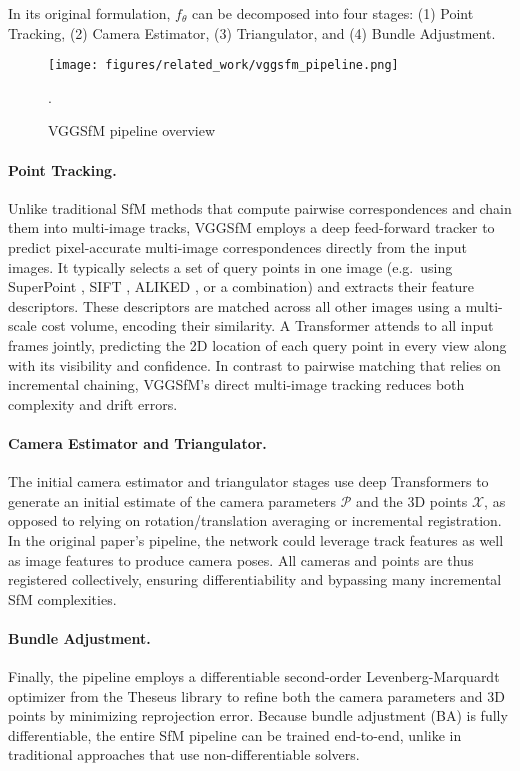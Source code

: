In its original formulation, $f_\theta$ can be decomposed into four stages: (1) Point Tracking, (2) Camera Estimator, (3) Triangulator, and (4) Bundle Adjustment.

\begin{figure}[h]
    \centering
    \texttt{[image: figures/related\_work/vggsfm\_pipeline.png]}
    \caption{VGGSfM pipeline overview \cite{wang2023vggsfm}}.
    \label{fig:vggsfm}
\end{figure}

\paragraph{Point Tracking.}
Unlike traditional SfM methods that compute pairwise correspondences and chain them into multi-image tracks, VGGSfM employs a deep feed-forward tracker to predict pixel-accurate multi-image correspondences directly from the input images. 
It typically selects a set of query points in one image (e.g.\ using SuperPoint \cite{detone18superpoint}, SIFT \cite{Lowe2004DistinctiveIF}, ALIKED \cite{Zhao2023ALIKED}, or a combination) and extracts their feature descriptors. These descriptors are matched across all other images using a multi-scale cost volume, encoding their similarity. 
A Transformer attends to all input frames jointly, predicting the 2D location of each query point in every view along with its visibility and confidence. 
In contrast to pairwise matching that relies on incremental chaining, VGGSfM's direct multi-image tracking reduces both complexity and drift errors.

\paragraph{Camera Estimator and Triangulator.}
The initial camera estimator and triangulator stages use deep Transformers to generate an initial estimate of the camera parameters $\mathcal{P}$ and the 3D points $\mathcal{X}$, as opposed to relying on rotation/translation averaging or incremental registration. 
In the original paper's pipeline, the network could leverage track features as well as image features to produce camera poses. All cameras and points are thus registered collectively, ensuring differentiability and bypassing many incremental SfM complexities.

\paragraph{Bundle Adjustment.}
Finally, the pipeline employs a differentiable second-order Levenberg-Marquardt optimizer from the Theseus library \cite{pineda2022theseus} to refine both the camera parameters and 3D points by minimizing reprojection error. 
Because bundle adjustment (BA) is fully differentiable, the entire SfM pipeline can be trained end-to-end, unlike in traditional approaches that use non-differentiable solvers.

